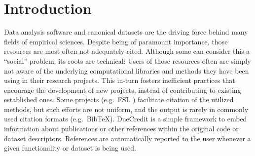 \documentclass[twocolumn]{bmcart}%
\begin{document}
\begin{frontmatter}
\begin{fmbox}

	








%
\end{fmbox}%

\end{frontmatter}


\section{Introduction}\label{introduction}

Data analysis software and canonical datasets are the driving force
behind many fields of empirical sciences. Despite being of paramount
importance, those resources are most often not adequately cited.
Although some can consider this a ``social'' problem, its roots are
technical: Users of those resources often are simply not aware of the
underlying computational libraries and methods they have been using in
their research projects. This in-turn fosters inefficient practices that
encourage the development of new projects, instead of contributing to
existing established ones. Some projects (e.g.~FSL
\cite{smith2004advances}) facilitate citation of the utilized methods,
but such efforts are not uniform, and the output is rarely in commonly
used citation formats (e.g.~BibTeX). DueCredit is a simple framework to
embed information about publications or other references within the
original code or dataset descriptors. References are automatically
reported to the user whenever a given functionality or dataset is being
used.
\end{document}
